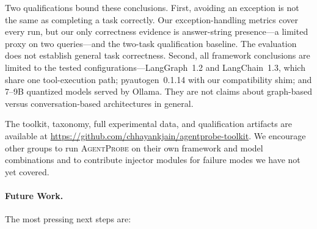 \documentclass[make,article,submit,moreauthors,pdftex]{mdpi}
\providecommand{\agentprobe}{\textsc{AgentProbe}}
\newcommand{\Wrev}[1]{\texorpdfstring{{\color{RevisionOrange}#1}}{#1}}
\begin{document}
\Wrev{Two qualifications bound these conclusions. First, avoiding an exception is not the same as completing a task correctly. Our exception-handling metrics cover every run, but our only correctness evidence is answer-string presence---a limited proxy on two queries---and the two-task qualification baseline. The evaluation does not establish general task correctness. Second, all framework conclusions are limited to the tested configurations---LangGraph~1.2 and LangChain~1.3, which share one tool-execution path; pyautogen~0.1.14 with our compatibility shim; and 7--9B quantized models served by Ollama. They are not claims about graph-based versus conversation-based architectures in general.}

The toolkit, taxonomy, full experimental data, and qualification artifacts are available at \url{https://github.com/chhayankjain/agentprobe-toolkit}. We encourage other groups to run \agentprobe{} on their own framework and model combinations and to contribute injector modules for failure modes we have not yet covered.

\paragraph{Future Work.}
The most pressing next steps are:
\end{document}
